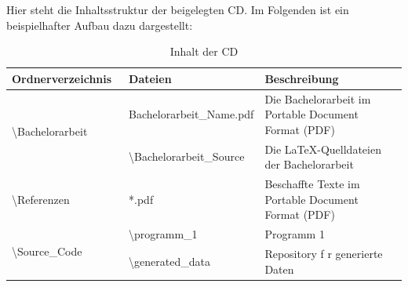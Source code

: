 \documentclass{article}
\begin{document}
\newpage
{}
\setcounter{page}{\thesavepage}







\newpage
{}
\label{anhang}

Hier steht die Inhaltsstruktur der beigelegten CD. Im Folgenden ist ein beispielhafter Aufbau dazu dargestellt:

\begin{table}[h]
	\begin{tabular}{|p{0.3\linewidth}|p{0.3\linewidth}|p{0.4\linewidth}|}
		\hline
		Ordnerverzeichnis                               & Dateien                                & Beschreibung                                         \\ \hline
		\multirow{2}{*}{\textbackslash{}Bachelorarbeit} & Bachelorarbeit\_Name.pdf               & Die Bachelorarbeit im Portable Document Format (PDF) \\
		                                                & \textbackslash{}Bachelorarbeit\_Source & Die LaTeX-Quelldateien der Bachelorarbeit            \\ \hline
		\textbackslash{}Referenzen                      & *.pdf                                  & Beschaffte Texte im Portable Document Format (PDF)   \\ \hline
		\multirow{2}{*}{\textbackslash{}Source\_Code}   & \textbackslash{}programm\_1            & Programm 1                                           \\
		                                                & \textbackslash{}generated\_data        & Repository f r generierte Daten                      \\\hline
	\end{tabular}
	\label{tab:anhang-inhalt-cd}
	\caption{Inhalt der CD}
\end{table}


\end{document}
